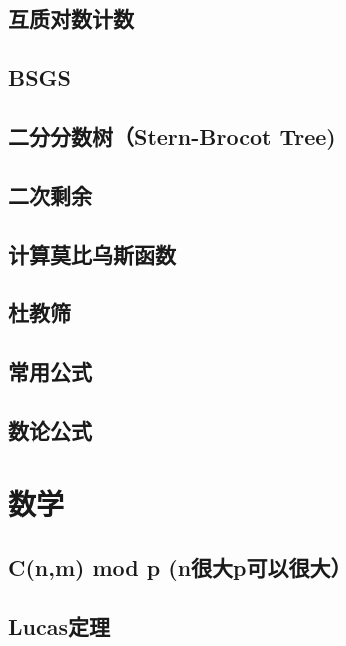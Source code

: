 \section{互质对数计数}
\raggedbottom
\hrulefill
\section{BSGS}
\raggedbottom
\hrulefill
\section{二分分数树（Stern-Brocot Tree)}
\raggedbottom
\hrulefill
\section{	二次剩余}
\raggedbottom
\hrulefill
\section{计算莫比乌斯函数}
\raggedbottom
\hrulefill
\section{杜教筛}
\raggedbottom
\hrulefill
\section{常用公式}
\raggedbottom
\hrulefill
\section{数论公式}
\raggedbottom
\hrulefill

\chapter{数学}
\section{C(n,m) mod p (n很大p可以很大）}
\raggedbottom
\hrulefill
\section{Lucas定理}
\raggedbottom
\hrulefill

